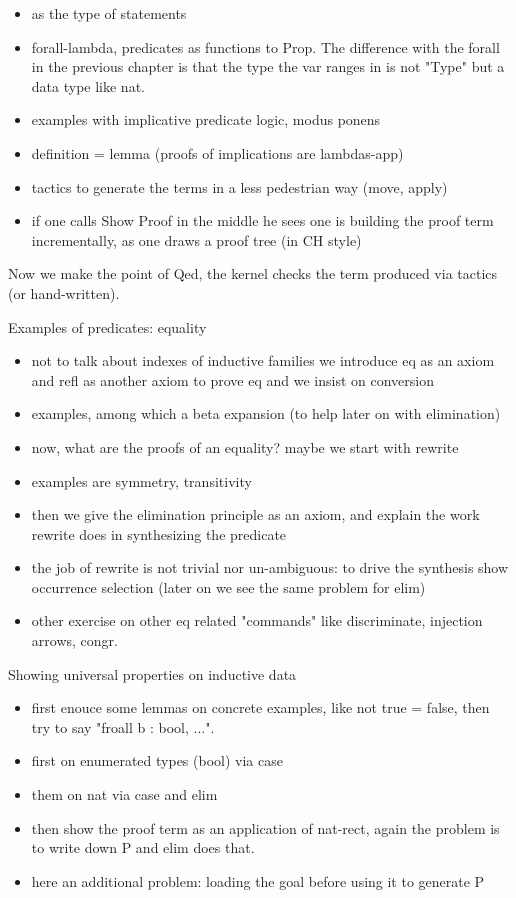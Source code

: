 \begin{itemize}
\item {} as the type of statements
\item forall-lambda, predicates as functions to Prop.  The difference with the forall in the previous chapter is that the type the var ranges in is not "Type" but a data type like nat.
\item examples with implicative predicate logic, modus ponens
\item definition = lemma (proofs of implications are lambdas-app)
\item tactics to generate the terms in a less pedestrian way (move, apply)
\item if one calls Show Proof in the middle he sees one is building
	the proof term incrementally, as one draws a proof tree (in CH style)
\end{itemize}

Now we make the point of Qed, the kernel checks the term produced via
tactics (or hand-written).

Examples of predicates: equality
\begin{itemize}
\item not to talk about indexes of inductive families we introduce eq as
	an axiom and refl as another axiom to prove eq and we insist on
	conversion
\item examples, among which a beta expansion (to help later on with elimination)
\item now, what are the proofs of an equality? maybe we start with rewrite
\item examples are symmetry, transitivity
\item then we give the elimination principle as an axiom, and explain the
	work rewrite does in synthesizing the predicate
\item the job of rewrite is not trivial nor un-ambiguous: to drive the synthesis show occurrence selection (later on we see the same problem for elim)
\item other exercise on other eq related "commands" like discriminate, injection arrows, congr.
\end{itemize}

Showing universal properties on inductive data
\begin{itemize}
\item first enouce some lemmas on concrete examples, like not true = false,
	then try to say "froall b : bool, ...".
\item first on enumerated types (bool) via case
\item them on nat via case and elim
\item then show the proof term as an application of nat-rect, again the problem
	is to write down P and elim does that.
\item here an additional problem: loading the goal before using it to generate P
\end{itemize}

